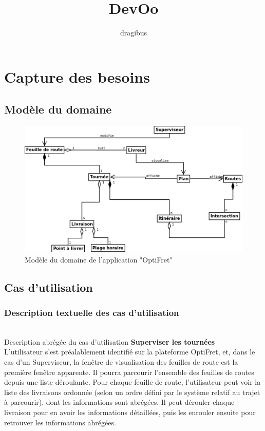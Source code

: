\documentclass[a4paper]{report}
\begin{document}
\title{DevOo}
\author{dragibus}

\maketitle

\tableofcontents


\chapter{Capture des besoins}

\section{Modèle du domaine}

\begin{figure}[h]
    \centering
    \includegraphics[scale = 0.7]{images/modele-domaine}
    \caption{Modèle du domaine de l'application "OptiFret"}
\end{figure}

\section{Cas d'utilisation}

\subsection{Description textuelle des cas d'utilisation}
~~\\

Description abrégée du cas d'utilisation \textbf{Superviser les tournées}\\

L'utilisateur s'est préalablement identifié sur la plateforme OptiFret, et,
dans le cas d'un Superviseur, la fenêtre de visualisation des feuilles de route
est la première fenêtre apparente. Il pourra parcourir l'ensemble des feuilles
de routes depuis une liste déroulante. Pour chaque feuille de route,
l'utilisateur peut voir la liste des livraisons ordonnée (selon un ordre défini
par le système relatif au trajet à parcourir), dont les informations sont
abrégées. Il peut dérouler chaque livraison pour en avoir les informations
détaillées, puis les enrouler ensuite pour retrouver les informations abrégées.
\end{document}
